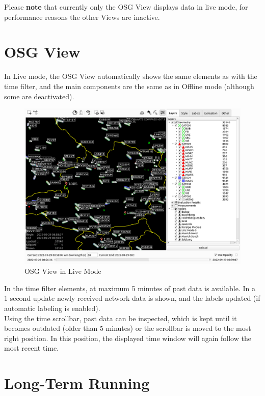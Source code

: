 Please \textbf{note} that currently only the OSG View displays data in live mode, for performance reasons the other Views are inactive.

\section{OSG View}

In Live mode, the OSG View automatically shows the same elements as with the time filter, and the main components are the same as in Offline mode (although some are deactivated).

\begin{figure}[H]
    \hspace*{-2.5cm}
    \includegraphics[width=19cm,frame]{figures/osg_live_mode.png}
  \caption{OSG View in Live Mode}
\end{figure} 

In the time filter elements, at maximum 5 minutes of past data is available. In a 1 second update newly received network data is shown, and the labels updated (if automatic labeling is enabled). \\

Using the time scrollbar, past data can be inspected, which is kept until it becomes outdated (older than 5 minutes) or the scrollbar is moved to the most right position. In this position, the displayed time window will again follow the most recent time.


\section{Long-Term Running}


